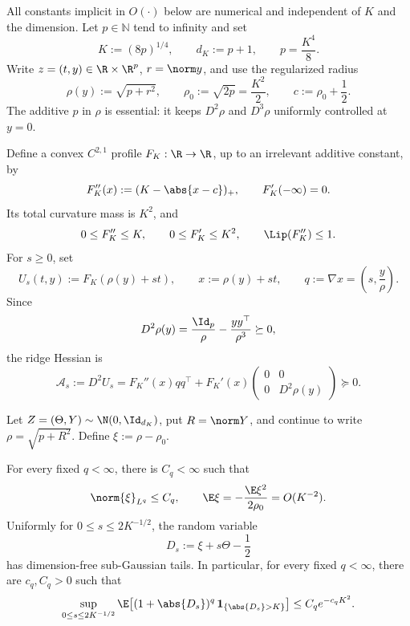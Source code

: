All constants implicit in \(O(\cdot)\) below are numerical and independent
of \(K\) and the dimension.  Let \(p\in\mathbb N\) tend to infinity and set
\begin{equation}
  K:=(8p)^{1/4},\qquad
  d_K:=p+1,\qquad
  p=\frac{K^4}{8}.
  \label{eq:app-ridge-dimension-scale}
\end{equation}
Write \(z=(t,y)\in\R\times\R^p\), \(r=\norm y\), and use the regularized
radius
\begin{equation}
  \rho(y):=\sqrt{p+r^2},\qquad
  \rho_0:=\sqrt{2p}=\frac{K^2}{2},\qquad
  c:=\rho_0+\frac12.
  \label{eq:app-ridge-radius}
\end{equation}
The additive \(p\) in \(\rho\) is essential: it keeps \(D^2\rho\) and
\(D^3\rho\) uniformly controlled at \(y=0\).

Define a convex \(C^{2,1}\) profile \(F_K:\R\to\R\), up to an irrelevant
additive constant, by
\begin{equation}
  F_K''(x):=(K-\abs{x-c})_+,\qquad
  F_K'(-\infty)=0.
  \label{eq:app-ridge-profile}
\end{equation}
Its total curvature mass is \(K^2\), and
\begin{equation}
  0\leq F_K''\leq K,\qquad
  0\leq F_K'\leq K^2,\qquad
  \Lip(F_K'')\leq1.
  \label{eq:app-ridge-profile-bounds}
\end{equation}
For \(s\geq0\), set
\begin{equation}
  U_s(t,y):=F_K(\rho(y)+st),\qquad
  x:=\rho(y)+st,\qquad
  q:=\nabla x=\left(s,\frac y\rho\right).
  \label{eq:app-ridge-ridge}
\end{equation}
Since
\[
  D^2\rho(y)=\frac{\Id_p}{\rho}-\frac{yy^\top}{\rho^3}\succeq0,
\]
the ridge Hessian is
\begin{equation}
  \mathcal A_s:=D^2U_s
  =
  F_K''(x)qq^\top+
  F_K'(x)
  \begin{pmatrix}
    0&0\\
    0&D^2\rho(y)
  \end{pmatrix}
  \succeq0.
  \label{eq:app-ridge-ridge-Hessian}
\end{equation}

Let \(Z=(\Theta,Y)\sim\N(0,\Id_{d_K})\), put
\(R=\norm Y\), and continue to write
\(\rho=\sqrt{p+R^2}\).  Define \(\xi:=\rho-\rho_0\).

\begin{lemma}
\label{lem:app-ridge-radial-concentration}
For every fixed \(q<\infty\), there is \(C_q<\infty\) such that
\begin{equation}
  \norm{\xi}_{L^q}\leq C_q,
  \qquad
  \E\xi=-\frac{\E\xi^2}{2\rho_0}=O(K^{-2}).
  \label{eq:app-ridge-radial-moments}
\end{equation}
Uniformly for \(0\leq s\leq2K^{-1/2}\), the random variable
\[
  D_s:=\xi+s\Theta-\frac12
\]
has dimension-free sub-Gaussian tails.  In particular, for every fixed
\(q<\infty\), there are \(c_q,C_q>0\) such that
\begin{equation}
  \sup_{0\leq s\leq2K^{-1/2}}
  \E\!\left[(1+\abs{D_s})^q\,
    \mathbf 1_{\{\abs{D_s}>K\}}\right]
  \leq C_qe^{-c_qK^2}.
  \label{eq:app-ridge-radial-tail}
\end{equation}
\end{lemma}

